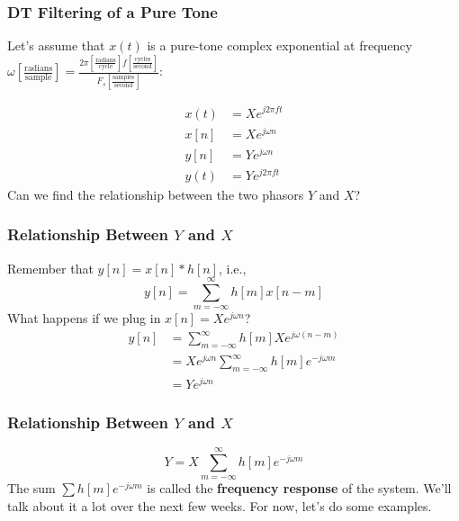 \documentclass{beamer}
\begin{document}
\begin{frame}
  \frametitle{DT Filtering of a Pure Tone}
  
  \begin{center}
  \end{center}
  Let's assume that $x(t)$ is a pure-tone complex exponential at
  frequency $\omega\left[\frac{\text{radians}}{\text{sample}}\right]=\frac{2\pi\left[\frac{\text{radians}}{\text{cycle}}\right]f\left[\frac{\text{cycles}}{\text{second}}\right]}{F_s\left[\frac{\text{samples}}{\text{second}}\right]}$:
  
  \begin{align*}
    x(t)&=Xe^{j2\pi ft}\\
    x[n]&=Xe^{j\omega n}\\
    y[n]&=Ye^{j\omega n}\\
    y(t)&=Ye^{j2\pi ft}
  \end{align*}
  Can we find the relationship between the two phasors $Y$ and $X$?
\end{frame}

\begin{frame}
  \frametitle{Relationship Between $Y$ and $X$}

  Remember that $y[n]=x[n]\ast h[n]$, i.e.,
  \begin{displaymath}
    y[n] = \sum_{m=-\infty}^\infty h[m]x[n-m]
  \end{displaymath}
  What happens if we plug in $x[n]=Xe^{j\omega n}$?
  \begin{align*}
    y[n] &= \sum_{m=-\infty}^\infty h[m]Xe^{j\omega(n-m)}\\
    &= Xe^{j\omega n}\sum_{m=-\infty}^\infty h[m]e^{-j\omega m}\\
    &= Ye^{j\omega n}
  \end{align*}
\end{frame}

\begin{frame}
  \frametitle{Relationship Between $Y$ and $X$}

  \begin{displaymath}
    Y = X\sum_{m=-\infty}^\infty h[m]e^{-j\omega m}
  \end{displaymath}
  The sum $\sum h[m]e^{-j\omega m}$ is called the {\bf frequency
    response} of the system.  We'll talk about it a lot over the next
  few weeks.  For now, let's do some examples.
\end{frame}
\end{document}
